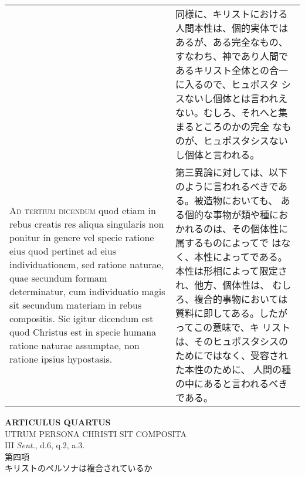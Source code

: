 \documentclass[10pt]{jsarticle} %
\begin{document}
\begin{longtable}{p{21em}p{21em}}
&

同様に、キリストにおける人間本性は、個的実体ではあるが、ある完全なもの、
すなわち、神であり人間であるキリスト全体との合一に入るので、ヒュポスタ
シスないし個体とは言われえない。むしろ、それへと集まるところのかの完全
なものが、ヒュポスタシスないし個体と言われる。

\\



{\scshape Ad tertium dicendum} quod etiam in rebus creatis res aliqua
singularis non ponitur in genere vel specie ratione eius quod pertinet
ad eius individuationem, sed ratione naturae, quae secundum formam
determinatur, cum individuatio magis sit secundum materiam in rebus
compositis. Sic igitur dicendum est quod Christus est in specie humana
ratione naturae assumptae, non ratione ipsius hypostasis.

&


第三異論に対しては、以下のように言われるべきである。被造物においても、
ある個的な事物が類や種におかれるのは、その個体性に属するものによってで
はなく、本性によってである。本性は形相によって限定され、他方、個体性は、
むしろ、複合的事物においては質料に即してある。したがってこの意味で、キ
リストは、そのヒュポスタシスのためにではなく、受容された本性のために、
人間の種の中にあると言われるべきである。


\end{longtable}
\newpage







\begin{center}
{\Large {\bf ARTICULUS QUARTUS}}\\ {\large UTRUM PERSONA CHRISTI SIT
COMPOSITA}\\ {\footnotesize III {\itshape Sent.}, d.6, q.2, a.3.}\\
{\Large 第四項\\キリストのペルソナは複合されているか}
\end{center}
\end{document}
